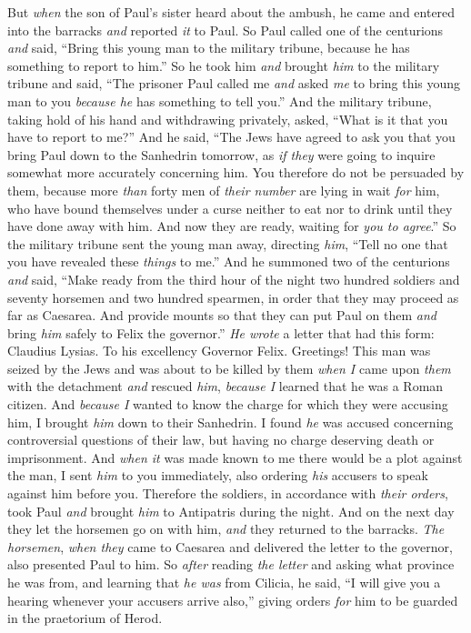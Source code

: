 \begin{biblechapter}
\verse But \textit{when} the son of Paul’s sister heard about the ambush, he came and entered into the barracks \textit{and} reported \textit{it} to Paul.
\verse So Paul called one of the centurions \textit{and} said, “Bring this young man to the military tribune, because he has something to report to him.”
\verse So he took him \textit{and} brought \textit{him} to the military tribune and said, “The prisoner Paul called me \textit{and} asked \textit{me} to bring this young man to you \textit{because he} has something to tell you.”
\verse And the military tribune, taking hold of his hand and withdrawing privately, asked, “What is it that you have to report to me?”
\verse And he said, “The Jews have agreed to ask you that you bring Paul down to the Sanhedrin tomorrow, as \textit{if they} were going to inquire somewhat more accurately concerning him.
\verse You therefore do not be persuaded by them, because more \textit{than} forty men of \textit{their number} are lying in wait \textit{for} him, who have bound themselves under a curse neither to eat nor to drink until they have done away with him. And now they are ready, waiting for \textit{you to agree}.”
\verse So the military tribune sent the young man away, directing \textit{him}, “Tell no one that you have revealed these \textit{things} to me.”
\verse And he summoned two of the centurions \textit{and} said, “Make ready from the third hour of the night two hundred soldiers and seventy horsemen and two hundred spearmen, in order that they may proceed as far as Caesarea.
\verse And provide mounts so that they can put Paul on them \textit{and} bring \textit{him} safely to Felix the governor.”
\verse \textit{He wrote} a letter that had this form:
\verse Claudius Lysias. To his excellency Governor Felix. Greetings!
\verse This man was seized by the Jews and was about to be killed by them \textit{when I} came upon \textit{them} with the detachment \textit{and} rescued \textit{him}, \textit{because I} learned that he was a Roman citizen.
\verse And \textit{because I} wanted to know the charge for which they were accusing him, I brought \textit{him} down to their Sanhedrin.
\verse I found \textit{he} was accused concerning controversial questions of their law, but having no charge deserving death or imprisonment.
\verse And \textit{when it} was made known to me there would be a plot against the man, I sent \textit{him} to you immediately, also ordering \textit{his} accusers to speak against him before you.
\verse Therefore the soldiers, in accordance with \textit{their orders}, took Paul \textit{and} brought \textit{him} to Antipatris during the night.
\verse And on the next day they let the horsemen go on with him, \textit{and} they returned to the barracks.
\verse \textit{The horsemen}, \textit{when they} came to Caesarea and delivered the letter to the governor, also presented Paul to him.
\verse So \textit{after} reading \textit{the letter} and asking what province he was from, and learning that \textit{he was} from Cilicia,
\verse he said, “I will give you a hearing whenever your accusers arrive also,” giving orders \textit{for} him to be guarded in the praetorium of Herod.
\end{biblechapter}


